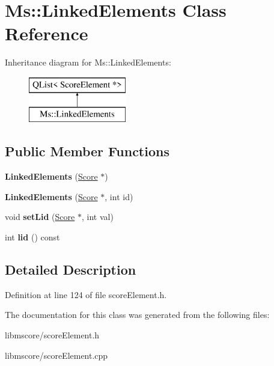 \hypertarget{class_ms_1_1_linked_elements}{}\section{Ms\+:\+:Linked\+Elements Class Reference}
\label{class_ms_1_1_linked_elements}
Inheritance diagram for Ms\+:\+:Linked\+Elements\+:\begin{figure}[H]
\begin{center}
\leavevmode
\includegraphics[height=2.000000cm]{class_ms_1_1_linked_elements}
\end{center}
\end{figure}
\subsection*{Public Member Functions}
\begin{DoxyCompactItemize}
\item 
\mbox{\label{class_ms_1_1_linked_elements_a9bce6d5d2bde4fc08a8de97d18fa9245}} 
{\bfseries Linked\+Elements} (\hyperlink{class_ms_1_1_score}{Score} $\ast$)
\item 
\mbox{\label{class_ms_1_1_linked_elements_a3efbfa8d407f438a29ac749f53baef24}} 
{\bfseries Linked\+Elements} (\hyperlink{class_ms_1_1_score}{Score} $\ast$, int id)
\item 
\mbox{\label{class_ms_1_1_linked_elements_a6c5f552f73c723f55c533fff608b56aa}} 
void {\bfseries set\+Lid} (\hyperlink{class_ms_1_1_score}{Score} $\ast$, int val)
\item 
\mbox{\label{class_ms_1_1_linked_elements_a44eaa2135b6ffd9803be19dde619d16c}} 
int {\bfseries lid} () const
\end{DoxyCompactItemize}


\subsection{Detailed Description}


Definition at line 124 of file score\+Element.\+h.



The documentation for this class was generated from the following files\+:\begin{DoxyCompactItemize}
\item 
libmscore/score\+Element.\+h\item 
libmscore/score\+Element.\+cpp\end{DoxyCompactItemize}
